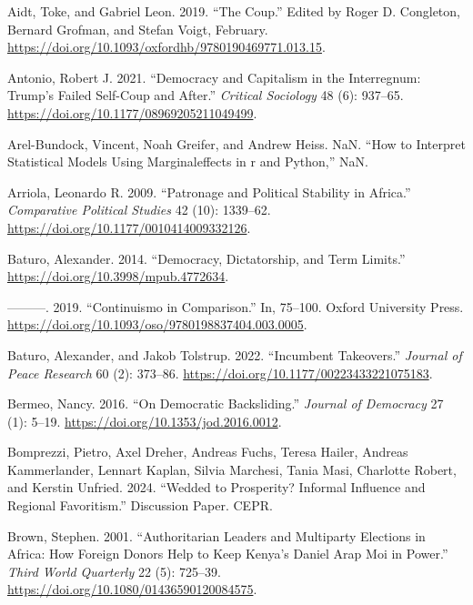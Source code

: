 \documentclass[
  12pt,
]{report}
\newlength{\cslhangindent}
\newenvironment{CSLReferences}[2] %
 {\begin{list}{}{%
  \setlength{\itemindent}{0pt}
  \setlength{\leftmargin}{0pt}
  \setlength{\parsep}{0pt}
  \ifodd #1
   \setlength{\leftmargin}{\cslhangindent}
   \setlength{\itemindent}{-1\cslhangindent}
  \fi
  \setlength{\itemsep}{#2\baselineskip}}}
 {\end{list}}
\begin{document}
\label{refs}
\begin{CSLReferences}{1}{0}
Aidt, Toke, and Gabriel Leon. 2019. {``The Coup.''} Edited by Roger D.
Congleton, Bernard Grofman, and Stefan Voigt, February.
\url{https://doi.org/10.1093/oxfordhb/9780190469771.013.15}.

Antonio, Robert J. 2021. {``Democracy and Capitalism in the Interregnum:
Trump{'}s Failed Self-Coup and After.''} \emph{Critical Sociology} 48
(6): 937--65. \url{https://doi.org/10.1177/08969205211049499}.

Arel-Bundock, Vincent, Noah Greifer, and Andrew Heiss. NaN. {``How to
Interpret Statistical Models Using
{\textbraceleft}Marginaleffects{\textbraceright} in
{\textbraceleft}r{\textbraceright} and
{\textbraceleft}Python{\textbraceright},''} NaN.

Arriola, Leonardo R. 2009. {``Patronage and Political Stability in
Africa.''} \emph{Comparative Political Studies} 42 (10): 1339--62.
\url{https://doi.org/10.1177/0010414009332126}.

Baturo, Alexander. 2014. {``Democracy, Dictatorship, and Term Limits.''}
\url{https://doi.org/10.3998/mpub.4772634}.

---------. 2019. {``Continuismo in Comparison.''} In, 75--100. Oxford
University Press.
\url{https://doi.org/10.1093/oso/9780198837404.003.0005}.

Baturo, Alexander, and Jakob Tolstrup. 2022. {``Incumbent Takeovers.''}
\emph{Journal of Peace Research} 60 (2): 373--86.
\url{https://doi.org/10.1177/00223433221075183}.

Bermeo, Nancy. 2016. {``On Democratic Backsliding.''} \emph{Journal of
Democracy} 27 (1): 5--19. \url{https://doi.org/10.1353/jod.2016.0012}.

Bomprezzi, Pietro, Axel Dreher, Andreas Fuchs, Teresa Hailer, Andreas
Kammerlander, Lennart Kaplan, Silvia Marchesi, Tania Masi, Charlotte
Robert, and Kerstin Unfried. 2024. {``Wedded to Prosperity? Informal
Influence and Regional Favoritism.''} Discussion Paper. CEPR.

Brown, Stephen. 2001. {``Authoritarian Leaders and Multiparty Elections
in Africa: How Foreign Donors Help to Keep Kenya's Daniel Arap Moi in
Power.''} \emph{Third World Quarterly} 22 (5): 725--39.
\url{https://doi.org/10.1080/01436590120084575}.


\end{CSLReferences}
\end{document}
